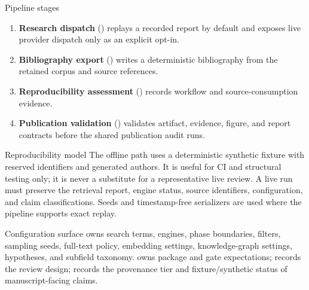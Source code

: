\documentclass[
  ignorenonframetext,
]{beamer}
\begin{document}
\begin{frame}{Pipeline stages}
\begin{enumerate}
  () applies configured quality
  and fixture-honesty checks.
\item
  \textbf{Research dispatch} ()
  replays a recorded report by default and exposes live provider
  dispatch only as an explicit opt-in.
\item
  \textbf{Bibliography export} ()
  writes a deterministic bibliography from the retained corpus and
  source references.
\item
  \textbf{Reproducibility assessment}
  () records workflow and
  source-consumption evidence.
\item
  \textbf{Publication validation} ()
  validates artifact, evidence, figure, and report contracts before the
  shared publication audit runs.
\end{enumerate}
\end{frame}

\begin{frame}[allowframebreaks]{Reproducibility model}
\label{reproducibility-model}
The offline path uses a deterministic synthetic fixture with reserved
identifiers and generated authors. It is useful for CI and structural
testing only; it is never a substitute for a representative live review.
A live run must preserve the retrieval report, engine status, source
identifiers, configuration, and claim classifications. Seeds and
timestamp-free serializers are used where the pipeline supports exact
replay.
\end{frame}

\begin{frame}{Configuration surface}
\label{configuration-surface}
 owns search terms, engines, phase
boundaries, filters, sampling seeds, full-text policy, embedding
settings, knowledge-graph settings, hypotheses, and subfield taxonomy.
 owns package and gate expectations;
 records the review design;
 records the provenance tier and
fixture/synthetic status of manuscript-facing claims.
\end{frame}
\end{document}
